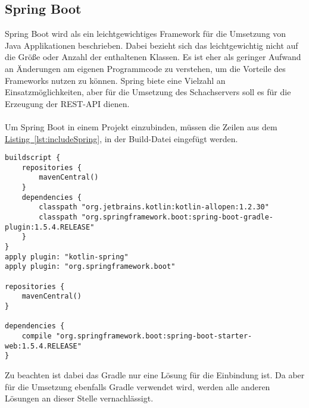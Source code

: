 \subsection{Spring Boot}\label{sec:bibspring}
Spring Boot wird als ein leichtgewichtiges Framework für die Umsetzung von Java Applikationen beschrieben. Dabei bezieht sich das leichtgewichtig nicht auf die Größe oder Anzahl der enthaltenen Klassen. Es ist eher als geringer Aufwand an Änderungen am eigenen Programmcode zu verstehen, um die Vorteile des Frameworks nutzen zu können. \cite{proSpring5} Spring biete eine Vielzahl an Einsatzmöglichkeiten, aber für die Umsetzung des Schachservers soll es für die Erzeugung der \gls{REST}-\gls{API} dienen.\\
\\
Um Spring Boot in einem Projekt einzubinden, müssen die Zeilen aus dem \hyperref[lst:includeSpring]{Listing~\ref{lst:includeSpring}}, in der Build-Datei  eingefügt werden.
\begin{lstlisting}[style=lstStyleFramed, language=Gradle, caption={Einbindung des Spring Framework mithilfe von Gradle}, label=lst:includeSpring, float]
buildscript {
	repositories {
		mavenCentral()
	}
	dependencies {
		classpath "org.jetbrains.kotlin:kotlin-allopen:1.2.30"
		classpath "org.springframework.boot:spring-boot-gradle-plugin:1.5.4.RELEASE"
	}
}
apply plugin: "kotlin-spring"
apply plugin: "org.springframework.boot"

repositories {
	mavenCentral()
}

dependencies {
	compile "org.springframework.boot:spring-boot-starter-web:1.5.4.RELEASE"
}
\end{lstlisting}
Zu beachten ist dabei das Gradle nur eine Lösung für die Einbindung ist. Da aber für die Umsetzung ebenfalls Gradle verwendet wird, werden alle anderen Lösungen an dieser Stelle vernachlässigt.\\
\\ 
